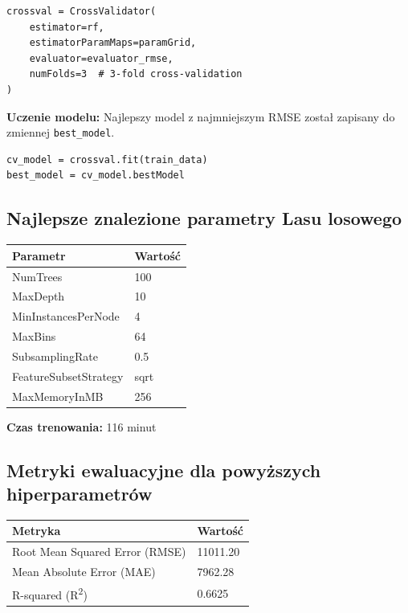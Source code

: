 \documentclass[12pt, a4paper]{report}
\begin{document}
\begin{lstlisting}[caption={CrossValidator do walidacji krzyżowej}]
crossval = CrossValidator(
    estimator=rf,
    estimatorParamMaps=paramGrid,
    evaluator=evaluator_rmse,
    numFolds=3  # 3-fold cross-validation
)
\end{lstlisting}

\vspace{1em}

\noindent \textbf{Uczenie modelu:}  
Najlepszy model z najmniejszym RMSE został zapisany do zmiennej \texttt{best\_model}.

\begin{lstlisting}[caption={Uczenie modelu i wybór najlepszego}]
cv_model = crossval.fit(train_data)
best_model = cv_model.bestModel
\end{lstlisting}

\subsection*{Najlepsze znalezione parametry Lasu losowego}
\noindent
\begin{center}
\begin{tabular}{l l}
\toprule
\textbf{Parametr}             & \textbf{Wartość} \\ 
\midrule
NumTrees                      & 100              \\
MaxDepth                      & 10               \\
MinInstancesPerNode           & 4                \\
MaxBins                       & 64               \\
SubsamplingRate               & 0.5              \\
FeatureSubsetStrategy         & sqrt             \\
MaxMemoryInMB                 & 256              \\
\bottomrule
\end{tabular}
\end{center}

\vspace{1em}

\noindent \textbf{Czas trenowania:}  
\large{116 minut}

\vspace{1em}

\subsection*{Metryki ewaluacyjne dla powyższych hiperparametrów}
\begin{center}
\begin{tabular}{l l}
\toprule
\textbf{Metryka}              & \textbf{Wartość} \\ 
\midrule
Root Mean Squared Error (RMSE) & 11011.20         \\
Mean Absolute Error (MAE)     & 7962.28          \\
R-squared (R\textsuperscript{2}) & 0.6625          \\
\bottomrule
\end{tabular}
\end{center}
\end{document}
